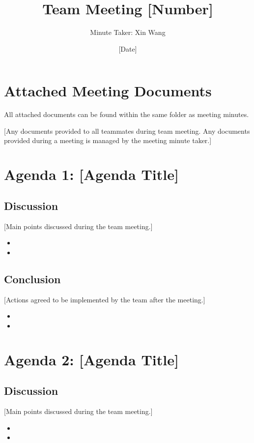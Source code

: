 \documentclass[a4paper]{article}
\author{Minute Taker: Xin Wang}
\title{Team Meeting [Number]}
\date{[Date]}
\begin{document}
\maketitle
\section{Attached Meeting Documents} 
All attached documents can be found within the same folder as meeting minutes.

[Any documents provided to all teammates during team meeting. Any documents provided during a meeting is managed by the meeting minute taker.]

\maketitle
\section{Agenda 1: [Agenda Title]} 
\subsection{Discussion}
[Main points discussed during the team meeting.]
\begin{itemize}
    \item 
    \item 
\end{itemize}
\subsection{Conclusion}
[Actions agreed to be implemented by the team after the meeting.]
\begin{itemize}
    \item 
    \item 
\end{itemize}

\section{Agenda 2: [Agenda Title]} 
\subsection{Discussion}
[Main points discussed during the team meeting.]
\begin{itemize}
    \item 
    \item 
\end{itemize}
\end{document}
